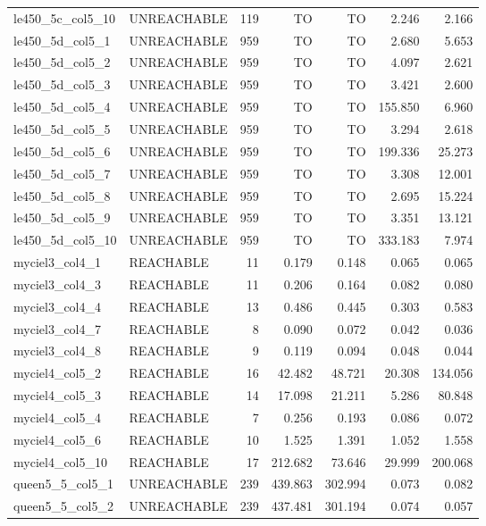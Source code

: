\begin{tabular}{llr|rrrr}
  le450\_5c\_col5\_10 & UNREACHABLE & 119 & TO & TO & 2.246 & 2.166 \\
  le450\_5d\_col5\_1 & UNREACHABLE & 959 & TO & TO & 2.680 & 5.653 \\
  le450\_5d\_col5\_2 & UNREACHABLE & 959 & TO & TO & 4.097 & 2.621 \\
  le450\_5d\_col5\_3 & UNREACHABLE & 959 & TO & TO & 3.421 & 2.600 \\
  le450\_5d\_col5\_4 & UNREACHABLE & 959 & TO & TO & 155.850 & 6.960 \\
  le450\_5d\_col5\_5 & UNREACHABLE & 959 & TO & TO & 3.294 & 2.618 \\
  le450\_5d\_col5\_6 & UNREACHABLE & 959 & TO & TO & 199.336 & 25.273 \\
  le450\_5d\_col5\_7 & UNREACHABLE & 959 & TO & TO & 3.308 & 12.001 \\
  le450\_5d\_col5\_8 & UNREACHABLE & 959 & TO & TO & 2.695 & 15.224 \\
  le450\_5d\_col5\_9 & UNREACHABLE & 959 & TO & TO & 3.351 & 13.121 \\ %
  le450\_5d\_col5\_10 & UNREACHABLE & 959 & TO & TO & 333.183 & 7.974 \\
  myciel3\_col4\_1 & REACHABLE & 11 & 0.179 & 0.148 & 0.065 & 0.065 \\
  myciel3\_col4\_3 & REACHABLE & 11 & 0.206 & 0.164 & 0.082 & 0.080 \\
  myciel3\_col4\_4 & REACHABLE & 13 & 0.486 & 0.445 & 0.303 & 0.583 \\
  myciel3\_col4\_7 & REACHABLE & 8 & 0.090 & 0.072 & 0.042 & 0.036 \\
  myciel3\_col4\_8 & REACHABLE & 9 & 0.119 & 0.094 & 0.048 & 0.044 \\
  myciel4\_col5\_2 & REACHABLE & 16 & 42.482 & 48.721 & 20.308 & 134.056 \\
  myciel4\_col5\_3 & REACHABLE & 14 & 17.098 & 21.211 & 5.286 & 80.848 \\
  myciel4\_col5\_4 & REACHABLE & 7 & 0.256 & 0.193 & 0.086 & 0.072 \\
  myciel4\_col5\_6 & REACHABLE & 10 & 1.525 & 1.391 & 1.052 & 1.558 \\ %
  myciel4\_col5\_10 & REACHABLE & 17 & 212.682 & 73.646 & 29.999 & 200.068 \\
  queen5\_5\_col5\_1 & UNREACHABLE & 239 & 439.863 & 302.994 & 0.073 & 0.082 \\
  queen5\_5\_col5\_2 & UNREACHABLE & 239 & 437.481 & 301.194 & 0.074 & 0.057 \\

\end{tabular}
